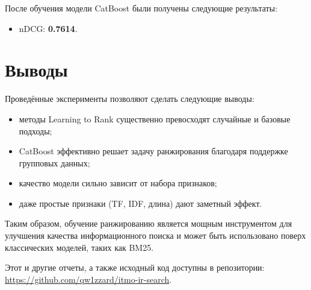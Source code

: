 \documentclass[11pt]{article}
\begin{document}
После обучения модели CatBoost были получены следующие результаты:
\begin{itemize}
    \item nDCG: \textbf{0.7614}.
\end{itemize}

\section{Выводы}

Проведённые эксперименты позволяют сделать следующие выводы:

\begin{itemize}
    \item методы Learning to Rank существенно превосходят случайные и базовые подходы;
    \item CatBoost эффективно решает задачу ранжирования благодаря поддержке групповых данных;
    \item качество модели сильно зависит от набора признаков;
    \item даже простые признаки (TF, IDF, длина) дают заметный эффект.
\end{itemize}

Таким образом, обучение ранжированию является мощным инструментом для улучшения
качества информационного поиска и может быть использовано поверх классических
моделей, таких как BM25.

Этот и другие отчеты, а также исходный код доступны в репозитории: \url{https://github.com/qw1zzard/itmo-ir-search}.
\end{document}
